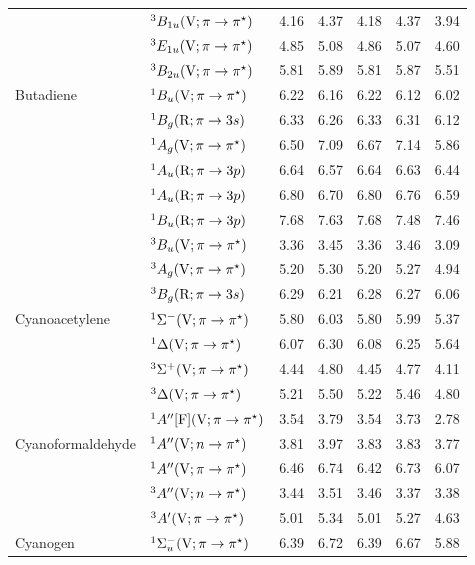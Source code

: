 \begin{tabular}{p{3.5cm}p{3.3cm}c|cccc}
        &$^3B_{1u} (\mathrm{V}; \pi \rightarrow \pi^\star)$				& 4.16	&4.37	&4.18	&4.37	&3.94\\
        &$^3E_{1u}(\mathrm{V}; \pi \rightarrow \pi^\star)$				& 4.85	&5.08	&4.86	&5.07	&4.60\\
        &$^3B_{2u} (\mathrm{V}; \pi \rightarrow \pi^\star)$				& 5.81	&5.89	&5.81	&5.87	&5.51\\
  Butadiene		&$^1B_u  (\mathrm{V}; \pi \rightarrow \pi^\star)$				& 6.22	&6.16	&6.22	&6.12	&6.02\\
        &$^1B_g (\mathrm{R}; \pi \rightarrow 3s)$				& 6.33	&6.26	&6.33	&6.31	&6.12\\
        &$^1A_g  (\mathrm{V}; \pi \rightarrow \pi^\star)$				& 6.50	&7.09	&6.67	&7.14	&5.86\\
        &$^1A_u (\mathrm{R}; \pi \rightarrow 3p)$				& 6.64	&6.57	&6.64	&6.63	&6.44\\
        &$^1A_u (\mathrm{R}; \pi \rightarrow 3p)$				& 6.80	&6.70	&6.80	&6.76	&6.59\\
        &$^1B_u (\mathrm{R}; \pi \rightarrow 3p)$				& 7.68	&7.63	&7.68	&7.48	&7.46\\
        &$^3B_u (\mathrm{V}; \pi \rightarrow \pi^\star)$				& 3.36	&3.45	&3.36	&3.46	&3.09\\
        &$^3A_g (\mathrm{V}; \pi \rightarrow \pi^\star)$				& 5.20	&5.30	&5.20	&5.27	&4.94\\
        &$^3B_g (\mathrm{R}; \pi \rightarrow 3s)$				& 6.29	&6.21	&6.28	&6.27	&6.06\\
  Cyanoacetylene&$^1\Sigma^- 	(\mathrm{V}; \pi \rightarrow \pi^\star)$ 			& 5.80	&6.03	&5.80	&5.99	&5.37\\
        &$^1\Delta 	(\mathrm{V}; \pi \rightarrow \pi^\star)$ 			& 6.07	&6.30	&6.08	&6.25	&5.64\\
        &$^3\Sigma^+	 (\mathrm{V}; \pi \rightarrow \pi^\star)$ 			& 4.44	&4.80	&4.45	&4.77	&4.11\\
        &$^3\Delta 	(\mathrm{V}; \pi \rightarrow \pi^\star)$ 			& 5.21	&5.50	&5.22	&5.46	&4.80\\
        &$^1A^{\prime\prime} [\mathrm{F}]	(\mathrm{V}; \pi \rightarrow \pi^\star)$ 			& 3.54	&3.79	&3.54	&3.73	&2.78\\
  Cyanoformaldehyde	&$^1A^{\prime\prime} (\mathrm{V}; n \rightarrow \pi^\star)$				& 3.81	&3.97	&3.83	&3.83	&3.77\\
        &$^1A^{\prime\prime} (\mathrm{V}; \pi \rightarrow \pi^\star)$					& 6.46	&6.74	&6.42	&6.73	&6.07\\
        &$^3A^{\prime\prime} (\mathrm{V}; n \rightarrow \pi^\star)$					& 3.44	&3.51	&3.46	&3.37	&3.38\\
        &$^3A^\prime (\mathrm{V}; \pi \rightarrow \pi^\star)$					& 5.01	&5.34	&5.01	&5.27	&4.63\\
  Cyanogen		& $^1\Sigma_u^- (\mathrm{V}; \pi \rightarrow \pi^\star)$ 			& 6.39	&6.72	&6.39	&6.67	&5.88\\

\end{tabular}
